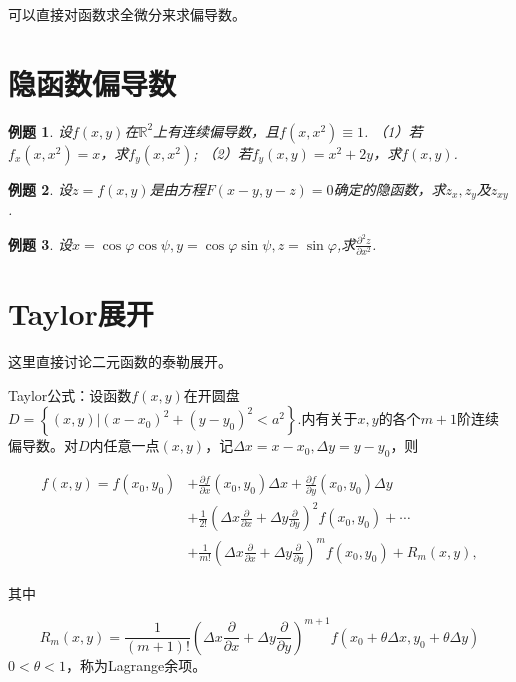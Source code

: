 \documentclass[UTF8]{ctexart}
\newtheorem{example}{例题}
\begin{document}
可以直接对函数求全微分来求偏导数。%

\section{隐函数偏导数}
\begin{example}
设$f(x,y)$在$\mathbb{R}^2$上有连续偏导数，且$f(x,x^2)\equiv 1$.
（1）若$f_x(x,x^2)=x$，求$f_y(x,x^2)$;
（2）若$f_y(x,y)=x^2+2y$，求$f(x,y)$.
\end{example}

\begin{example}
设$z=f(x,y)$是由方程$F(x-y,y-z)=0$确定的隐函数，求$z_x,z_y$及$z_{xy}$.
\end{example}

\begin{example}
设$x=\cos \varphi \cos \psi, y=\cos \varphi \sin \psi, z=\sin \varphi$,求$\frac{\partial^{2} z}{\partial x^{2}}$.
\end{example}

\section{Taylor展开}

这里直接讨论二元函数的泰勒展开。

Taylor公式：设函数$f(x,y)$在开圆盘$D=\left\{(x, y) |\left(x-x_{0}\right)^{2}+\left(y-y_{0}\right)^{2}<a^2\right\}.$内有关于$x,y$的各个$m+1$阶连续偏导数。对$D$内任意一点$(x,y)$，记$\Delta x=x-x_{0}, \Delta y=y-y_{0}$，则

$$\begin{aligned}
f(x, y)=f\left(x_{0}, y_{0}\right) &+\frac{\partial f}{\partial x}\left(x_{0}, y_{0}\right) \Delta x+\frac{\partial f}{\partial y}\left(x_{0}, y_{0}\right) \Delta y \\
&+\frac{1}{2 !}\left(\Delta x \frac{\partial}{\partial x}+\Delta y \frac{\partial}{\partial y}\right)^{2} f\left(x_{0}, y_{0}\right)+\cdots \\
&+\frac{1}{m !}\left(\Delta x \frac{\partial}{\partial x}+\Delta y \frac{\partial}{\partial y}\right)^{m} f\left(x_{0}, y_{0}\right)+R_{m}(x, y),
\end{aligned}$$

其中

$$R_{m}(x, y)=\frac{1}{(m+1) !}\left(\Delta x \frac{\partial}{\partial x}+\Delta y \frac{\partial}{\partial y}\right)^{m+1} f\left(x_{0}+\theta \Delta x, y_{0}+\theta \Delta y\right)$$
$0<\theta<1$，称为Lagrange余项。
\end{document}
